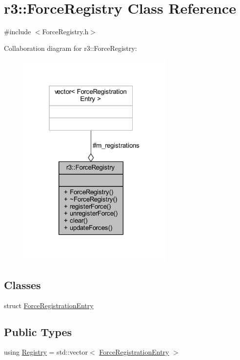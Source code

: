 \hypertarget{classr3_1_1_force_registry}{}\section{r3\+:\+:Force\+Registry Class Reference}
\label{classr3_1_1_force_registry}


{\ttfamily \#include $<$Force\+Registry.\+h$>$}



Collaboration diagram for r3\+:\+:Force\+Registry\+:\nopagebreak
\begin{figure}[H]
\begin{center}
\leavevmode
\includegraphics[width=220pt]{classr3_1_1_force_registry__coll__graph}
\end{center}
\end{figure}
\subsection*{Classes}
\begin{DoxyCompactItemize}
\item 
struct \mbox{\hyperlink{structr3_1_1_force_registry_1_1_force_registration_entry}{Force\+Registration\+Entry}}
\end{DoxyCompactItemize}
\subsection*{Public Types}
\begin{DoxyCompactItemize}
\item 
using \mbox{\hyperlink{classr3_1_1_force_registry_a91449a71b1a33d773ef787ae56ae9b2d}{Registry}} = std\+::vector$<$ \mbox{\hyperlink{structr3_1_1_force_registry_1_1_force_registration_entry}{Force\+Registration\+Entry}} $>$
\end{DoxyCompactItemize}
